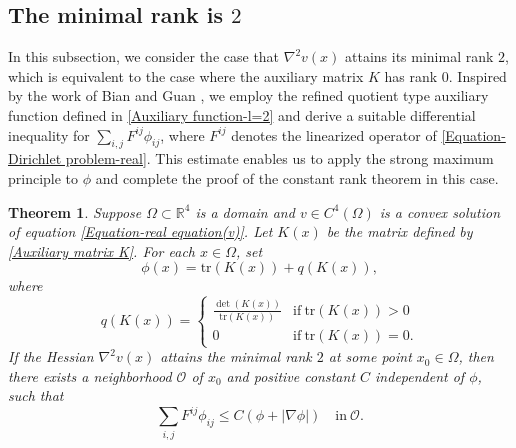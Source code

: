\documentclass[11pt]{amsart}
\newtheorem{theorem}{Theorem}
\numberwithin{theorem}{section}
\numberwithin{equation}{section}
\begin{document}
\subsection{The minimal rank is $2$}\label{Section 3.1} In this subsection, we consider the case that $\nabla^2v(x)$ attains its minimal rank $2$, which is equivalent to the case where the auxiliary matrix $K$ has rank $0$. Inspired by the work of Bian and Guan \cite{Bian-Guan2009}, we employ the refined quotient type auxiliary function defined in \eqref{Auxiliary function-l=2} and derive a suitable differential inequality for $\sum_{i,j}F^{ij}\phi_{ij}$, where $F^{ij}$ denotes the linearized operator of \eqref{Equation-Dirichlet problem-real}. This estimate enables us to apply the strong maximum principle to $\phi$ and complete the proof of the constant rank theorem in this case.

\begin{theorem}\label{Theorem-minimal rank is 2}
Suppose $\Omega\subset\mathbb{R}^4$ is a domain and $v\in C^4(\Omega)$ is a convex solution of equation \eqref{Equation-real equation(v)}. Let $K(x)$ be the matrix defined by \eqref{Auxiliary matrix K}. For each $x\in\Omega$, set $$\phi(x)=\mathrm{tr}(K(x))+q(K(x)),$$ where $$q(K(x))=\begin{cases}
\frac{\det(K(x))}{\mathrm{tr}(K(x))} & \mathrm{if}\ \mathrm{tr}(K(x))>0\\
0 & \mathrm{if}\ \mathrm{tr}(K(x))=0.
\end{cases}$$ If the Hessian $\nabla^2v(x)$ attains the minimal rank $2$ at some point $x_0\in\Omega$, then there exists a neighborhood $\mathcal{O}$ of $x_0$ and positive constant $C$ independent of $\phi$, such that
\begin{equation}\label{Inequ-Theorem-minimal rank=2}
\sum_{i,j}F^{ij}\phi_{ij}\leq C(\phi+|\nabla\phi|)\quad \mathrm{in}\ \mathcal{O}.
\end{equation}
\end{theorem}
\end{document}
